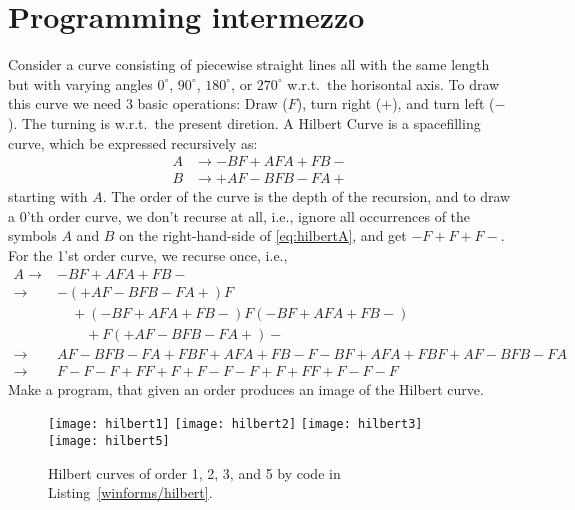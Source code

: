 \section{Programming intermezzo}
\begin{problem}
  Consider a curve consisting of piecewise straight lines all with the same length but with varying angles $0^{\circ}$, $90^{\circ}$, $180^{\circ}$, or $270^{\circ}$ w.r.t.\ the horisontal axis. To draw this curve we need 3 basic operations: Draw ($F$), turn right ($+$), and turn left ($-$). The turning is w.r.t.\ the present diretion. A Hilbert Curve is a spacefilling curve, which be expressed recursively as:
\begin{align}
  A &\rightarrow -BF+AFA+FB-\label{eq:hilbertA}\\
  B &\rightarrow +AF-BFB-FA+\label{eq:hilbertB}
\end{align}
starting with $A$. The order of the curve is the depth of the recursion, and to draw a 0'th order curve, we don't recurse at all, i.e., ignore all occurrences of the symbols $A$ and $B$ on the right-hand-side of \eqref{eq:hilbertA}, and get $-F+F+F-$. For the 1'st order curve, we recurse once, i.e., 
\begin{align*}
  A 
  \rightarrow &-BF+AFA+FB- \\
  \rightarrow &-(+AF-BFB-FA+)F\\
               &\quad+(-BF+AFA+FB-)F(-BF+AFA+FB-)\\
               &\qquad +F(+AF-BFB-FA+)-\\
  \rightarrow &AF-BFB-FA+FBF+AFA+FB-F-BF+AFA+FBF+AF-BFB-FA\\
  \rightarrow &F-F-F+FF+F+F-F-F+F+FF+F-F-F
\end{align*}
Make a program, that given an order produces an image of the Hilbert curve.
\end{problem}
%
%
\begin{figure}
  \centering
  \texttt{[image: hilbert1]}
  \texttt{[image: hilbert2]}
  \texttt{[image: hilbert3]}
  \texttt{[image: hilbert5]}
  \caption{Hilbert curves of order 1, 2, 3, and 5 by code in Listing~\ref{winforms/hilbert}.}
  \label{fig:hilbert1}
\end{figure}

%
%

